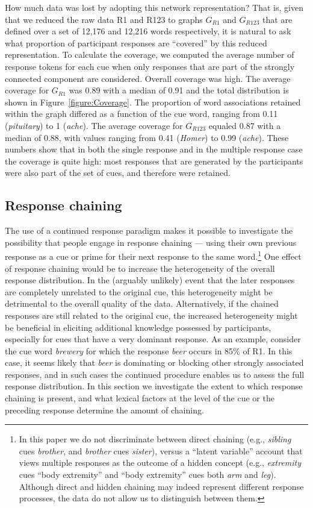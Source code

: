 \documentclass[a4paper,doc,natbib,floatsintext]{apa6}
\newcommand{\stim}[1]{\textsl{#1}}
\begin{document}
How much data was lost by adopting this network representation? That is, given that we reduced the raw data R1 and R123 to graphs $G_{R1}$ and $G_{R123}$ that are defined over a set of 12,176 and 12,216 words respectively, it is natural to ask what proportion of participant responses are ``covered'' by this reduced representation. To calculate the coverage, we computed the average number of response tokens for each cue when only responses that are part of the strongly connected component are considered. Overall coverage was high. The average coverage for $G_{R1}$ was 0.89 with a median of 0.91 and the total distribution is shown in Figure~\ref{figure:Coverage}.
The proportion of word associations retained within the graph differed as a function of the cue word, ranging from 0.11 (\stim{pituitary}) to 1 (\stim{ache}). The average coverage for $G_{R123}$ equaled 0.87 with a median of 0.88, with values ranging from 0.41 (\stim{Homer}) to 0.99 (\stim{ache}). These numbers show that in both the single response and in the multiple response case the coverage is quite high: most responses that are generated by the participants were also part of the set of cues, and therefore were retained.



\subsection{Response chaining}
The use of a continued response paradigm makes it possible to investigate the possibility that people engage in response chaining --- using their own previous response as a cue or prime for their next response to the same word.\footnote{In this paper we do not discriminate between direct chaining (e.g., \stim{sibling} cues \stim{brother}, and \stim{brother} cues \stim{sister}), versus a ``latent variable'' account that views multiple responses as the outcome of a hidden concept (e.g., \stim{extremity} cues ``body extremity'' and ``body extremity'' cues both \stim{arm} and \stim{leg}). Although direct and hidden chaining may indeed represent different response processes, the data do not allow us to distinguish between them.} One effect of response chaining would be to increase the heterogeneity of the overall response distribution. In the (arguably unlikely) event that the later responses are completely unrelated to the original cue, this heterogeneity might be detrimental to the overall quality of the data. Alternatively, if the chained responses are still related to the original cue, the increased heterogeneity might be beneficial in eliciting additional knowledge possessed by participants, especially for cues that have a very dominant response. As an example, consider the cue word \stim{brewery} for which the response \stim{beer} occurs in 85\% of R1. In this case, it seems likely that \stim{beer} is dominating or blocking other strongly associated responses, and in such cases the continued procedure enables us to assess the full response distribution. In this section we investigate the extent to which response chaining is present, and what lexical factors at the level of the cue or the preceding response determine the amount of chaining.
\end{document}
